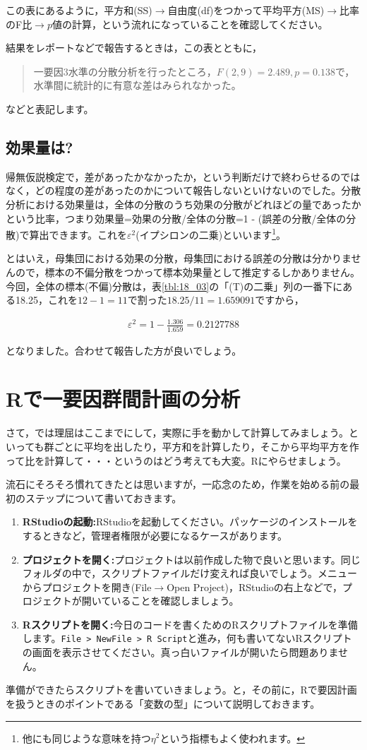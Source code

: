 \documentclass{ltjbook}
\begin{document}
この表にあるように，平方和(SS)$\to$自由度(df)をつかって平均平方(MS)$\to$比率のF比$\to$$p$値の計算，という流れになっていることを確認してください。

結果をレポートなどで報告するときは，この表とともに，
\begin{quote}
	一要因3水準の分散分析を行ったところ，$F(2,9)=2.489,p=0.138$で，水準間に統計的に有意な差はみられなかった。
\end{quote}
などと表記します。


\subsection{効果量は?}
帰無仮説検定で，差があったかなかったか，という判断だけで終わらせるのではなく，どの程度の差があったのかについて報告しないといけないのでした。分散分析における効果量は，全体の分散のうち効果の分散がどれほどの量であったかという比率，つまり効果量=効果の分散/全体の分散=1 - (誤差の分散/全体の分散)で算出できます。これを$\varepsilon^2$(イプシロンの二乗)といいます\footnote{他にも同じような意味を持つ$\eta^2$という指標もよく使われます。}。

とはいえ，母集団における効果の分散，母集団における誤差の分散は分かりませんので，標本の不偏分散をつかって標本効果量として推定するしかありません。今回，全体の標本(不偏)分散は，表\ref{tbl:18_03}の「(T)の二乗」列の一番下にある18.25，これを$12-1=11$で割った$18.25/11=1.659091$ですから，

\begin{align}
\varepsilon^2 = 1 - \frac{1.306}{1.659} = 0.2127788
\end{align}

となりました。合わせて報告した方が良いでしょう。


\section{Rで一要因群間計画の分析}

さて，では理屈はここまでにして，実際に手を動かして計算してみましょう。といっても群ごとに平均を出したり，平方和を計算したり，そこから平均平方を作って比を計算して・・・というのはどう考えても大変。Rにやらせましょう。

流石にそろそろ慣れてきたとは思いますが，一応念のため，作業を始める前の最初のステップについて書いておきます。
\begin{enumerate}
	\item \textbf{RStudioの起動:}RStudioを起動してください。パッケージのインストールをするときなど，管理者権限が必要になるケースがあります。
	\item \textbf{プロジェクトを開く:}プロジェクトは以前作成した物で良いと思います。同じフォルダの中で，スクリプトファイルだけ変えれば良いでしょう。メニューからプロジェクトを開き(File$\to$Open Project)，RStudioの右上などで，プロジェクトが開いていることを確認しましょう。
	\item \textbf{Rスクリプトを開く:}今日のコードを書くためのRスクリプトファイルを準備します。\verb|File > NewFile > R Script|と進み，何も書いてないRスクリプトの画面を表示させてください。真っ白いファイルが開いたら問題ありません。
\end{enumerate}
準備ができたらスクリプトを書いていきましょう。と，その前に，Rで要因計画を扱うときのポイントである「変数の型」について説明しておきます。
\end{document}
